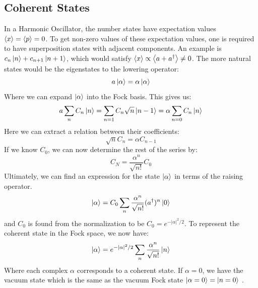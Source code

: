\subsection{Coherent States}
In a Harmonic Oscillator, the number states have expectation values $\expval{x} = \expval{p} = 0$. To get non-zero values of these expectation values, one is required to have superposition states with adjacent components. An example is $c_n\ket{n} + c_{n+1} \ket{n+1}$, which would satisfy $\expval{x} \propto \expval{a + a^\dagger} \neq 0$. The more natural states would be the eigenstates to the lowering operator:
\begin{equation}
    a \ket{\alpha} = \alpha \ket{\alpha}
\end{equation}
Where we can expand $\ket{\alpha}$ into the Fock basis. This gives us:
\begin{align}
    a \sum_n C_n \ket{n} =     \sum_{n = 1} C_n \sqrt{n} \ket{n - 1} = \alpha \sum_{n = 0} C_n \ket{n}
\end{align}
Here we can extract a relation between their coefficients:
\begin{equation}
    \sqrt{n} C_n = \alpha C_{n - 1}
\end{equation}
If we know $C_0$, we can now determine the rest of the series by:
\begin{equation}
    C_N = \frac{\alpha^n}{\sqrt{n!}} C_0 
\end{equation}
Ultimately, we can find an expression for the state $\ket{\alpha}$ in terms of the raising operator.
\begin{equation}
    \ket{\alpha} = C_0 \sum_n \frac{\alpha^n} {\sqrt{n!}} (a^\dagger)^n \ket{0}
\end{equation}
and $C_0$ is found from the normalization to be $C_0 = e^{- |\alpha|^2 / 2}$. To represent the coherent state in the Fock space, we now have:
\begin{equation}
    \ket{\alpha} = e^{-|\alpha|^2 / 2} \sum_n \frac{\alpha^n}{\sqrt{n!}} \ket{n}
\end{equation}
Where each complex $\alpha$ corresponds to a coherent state. If $\alpha = 0$, we have the vacuum state which is the same as the vacuum Fock state $\ket{\alpha = 0} = \ket{n = 0}$ \cite{gerry_introductory_2004}. 




